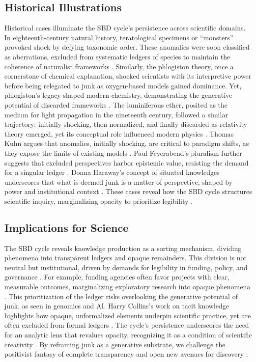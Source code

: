 \documentclass[11pt]{article}
\begin{document}
\subsection{Historical Illustrations}
Historical cases illuminate the SBD cycle’s persistence across scientific domains. In eighteenth-century natural history, teratological specimens or ``monsters'' provoked shock by defying taxonomic order. These anomalies were soon classified as aberrations, excluded from systematic ledgers of species to maintain the coherence of naturalist frameworks \citep{daston1998}. Similarly, the phlogiston theory, once a cornerstone of chemical explanation, shocked scientists with its interpretive power before being relegated to junk as oxygen-based models gained dominance. Yet, phlogiston’s legacy shaped modern chemistry, demonstrating the generative potential of discarded frameworks \citep{shapin1985}. The luminiferous ether, posited as the medium for light propagation in the nineteenth century, followed a similar trajectory: initially shocking, then normalized, and finally discarded as relativity theory emerged, yet its conceptual role influenced modern physics \citep{whittaker1951}. Thomas Kuhn argues that anomalies, initially shocking, are critical to paradigm shifts, as they expose the limits of existing models \citep{kuhn1962}. Paul Feyerabend’s pluralism further suggests that excluded perspectives harbor epistemic value, resisting the demand for a singular ledger \citep{feyerabend1975}. Donna Haraway’s concept of situated knowledges underscores that what is deemed junk is a matter of perspective, shaped by power and institutional context \citep{haraway1988}. These cases reveal how the SBD cycle structures scientific inquiry, marginalizing opacity to prioritize legibility \citep{bowker2005, collins1992}.

\subsection{Implications for Science}
The SBD cycle reveals knowledge production as a sorting mechanism, dividing phenomena into transparent ledgers and opaque remainders. This division is not neutral but institutional, driven by demands for legibility in funding, policy, and governance \citep{scott1998}. For example, funding agencies often favor projects with clear, measurable outcomes, marginalizing exploratory research into opaque phenomena \citep{bowker2005}. This prioritization of the ledger risks overlooking the generative potential of junk, as seen in genomics and AI. Harry Collins’s work on tacit knowledge highlights how opaque, unformalized elements underpin scientific practice, yet are often excluded from formal ledgers \citep{collins1992}. The cycle’s persistence underscores the need for an analytic lens that revalues opacity, recognizing it as a condition of scientific creativity \citep{rheinberger1997, barad2007}. By reframing junk as a generative substrate, we challenge the positivist fantasy of complete transparency and open new avenues for discovery \citep{hacking1983, shapin1985, star1989}.
\end{document}
